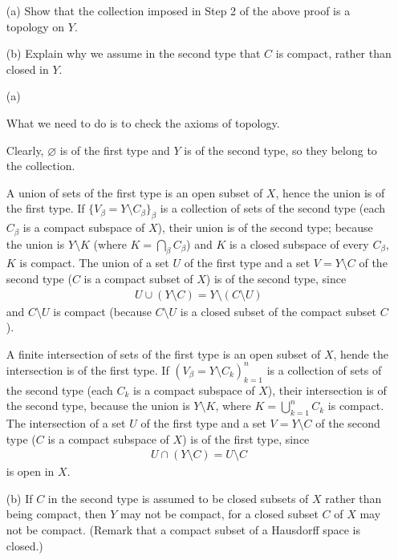 \begin{prob}\label{check 1p cptf topology}
    \begin{enumerate}
        \item[(a)]
        {
            Show that the collection imposed in Step 2 of the above proof is a topology on $Y$.
        }
        \item[(b)]
        {
            Explain why we assume in the second type that $C$ is compact, rather than closed in $Y$.
        }
    \end{enumerate}
\end{prob}
\begin{sol}
    \begin{enumerate}
        \item[(a)]
        {
            What we need to do is to check the axioms of topology.
            
            Clearly, $\varnothing$ is of the first type and $Y$ is of the second type, so they belong to the collection.

            A union of sets of the first type is an open subset of $X$, hence the union is of the first type.
            If $\{V_\beta=Y\setminus C_\beta\}_\beta$ is a collection of sets of the second type (each $C_\beta$ is a compact subspace of $X$), their union is of the second type; because the union is $Y\setminus K$ (where $K=\bigcap_\beta C_\beta$) and $K$ is a closed subspace of every $C_\beta$, $K$ is compact.
            The union of a set $U$ of the first type and a set $V=Y\setminus C$ of the second type ($C$ is a compact subset of $X$) is of the second type, since
            \begin{align*}
                U\cup (Y\setminus C)=Y\setminus (C\setminus U)
            \end{align*}
            and $C\setminus U$ is compact (because $C\setminus U$ is a closed subset of the compact subset $C$).

            A finite intersection of sets of the first type is an open subset of $X$, hende the intersection is of the first type.
            If $(V_\beta=Y\setminus C_k)_{k=1}^n$ is a collection of sets of the second type (each $C_k$ is a compact subspace of $X$), their intersection is of the second type, because the union is $Y\setminus K$, where $K=\bigcup_{k=1}^n C_k$ is compact.
            The intersection of a set $U$ of the first type and a set $V=Y\setminus C$ of the second type ($C$ is a compact subspace of $X$) is of the first type, since
            \begin{align*}
                U\cap (Y\setminus C)=U\setminus C
            \end{align*}
            is open in $X$.
        }
        \item[(b)]
        {
            If $C$ in the second type is assumed to be closed subsets of $X$ rather than being compact, then $Y$ may not be compact, for a closed subset $C$ of $X$ may not be compact.
            (Remark that a compact subset of a Hausdorff space is closed.)
        }
    \end{enumerate}
\end{sol}

